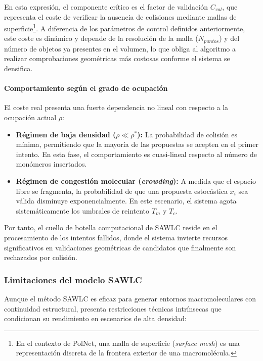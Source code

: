 En esta expresión, el componente crítico es el factor de validación $C_{val}$, que representa el coste de verificar la ausencia de colisiones mediante {mallas de superficie}\footnote{En el contexto de PolNet, una malla de superficie (\textit{surface mesh}) es una representación discreta de la frontera exterior de una macromolécula.}. A diferencia de los parámetros de control definidos anteriormente, este coste es dinámico y depende de la resolución de la malla ($N_{puntos}$) y del número de objetos ya presentes en el volumen, lo que obliga al algoritmo a realizar comprobaciones geométricas más costosas conforme el sistema se densifica.

\paragraph{Comportamiento según el grado de ocupación}

El coste real presenta una fuerte dependencia no lineal con respecto a la ocupación actual $\rho$:

\begin{itemize}
    \item \textbf{Régimen de baja densidad ($\rho \ll \rho^*$):} La probabilidad de colisión es mínima, permitiendo que la mayoría de las propuestas se acepten en el primer intento. En esta fase, el comportamiento es cuasi-lineal respecto al número de monómeros insertados.
    \item \textbf{Régimen de congestión molecular (\textit{crowding}):} A medida que el espacio libre se fragmenta, la probabilidad de que una propuesta estocástica $x_i$ sea válida disminuye exponencialmente. En este escenario, el sistema agota sistemáticamente los umbrales de reintento $T_m$ y $T_c$.
\end{itemize}

Por tanto, el cuello de botella computacional de SAWLC reside en el procesamiento de los intentos fallidos, donde el sistema invierte recursos significativos en validaciones geométricas de candidatos que finalmente son rechazados por colisión.

\subsubsection{Limitaciones del modelo SAWLC}

Aunque el método SAWLC es eficaz para generar entornos macromoleculares con continuidad estructural, presenta restricciones técnicas intrínsecas que condicionan su rendimiento en escenarios de alta densidad:

